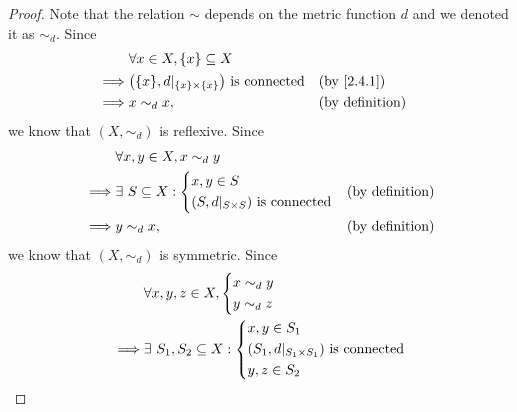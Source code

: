 \begin{proof}
  Note that the relation \(\sim\) depends on the metric function \(d\) and we denoted it as \(\sim_d\).
  Since
  \begin{align*}
             & \forall x \in X, \{x\} \subseteq X                                                        \\
    \implies & \big(\{x\}, d|_{\{x\} \times \{x\}}\big) \text{ is connected} &  & \by{2.4.1}             \\
    \implies & x \sim_d x,                                                   &  & \text{(by definition)}
  \end{align*}
  we know that \((X, \sim_d)\) is reflexive.
  Since
  \begin{align*}
             & \forall x, y \in X, x \sim_d y                                        \\
    \implies & \exists\ S \subseteq X : \begin{dcases}
                                          x, y \in S \\
                                          (S, d|_{S \times S}) \text{ is connected}
                                        \end{dcases} &  & \text{(by definition)}     \\
    \implies & y \sim_d x,                               &  & \text{(by definition)}
  \end{align*}
  we know that \((X, \sim_d)\) is symmetric.
  Since
  \begin{align*}
             & \forall x, y, z \in X, \begin{dcases}
                                        x \sim_d y \\
                                        y \sim_d z
                                      \end{dcases}                                                                                                          \\
    \implies & \exists\ S_1, S_2 \subseteq X : \begin{dcases}
                                                 x, y \in S_1                                    \\
                                                 (S_1, d|_{S_1 \times S_1}) \text{ is connected} \\
                                                 y, z \in S_2                                    \\

\end{dcases}
\end{align*}
\end{proof}
